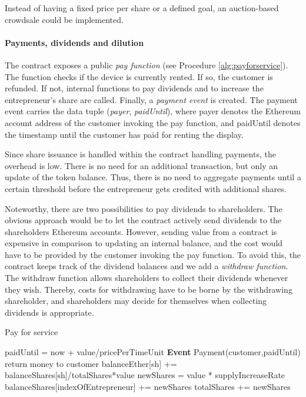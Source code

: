 Instead of having a fixed price per share or a defined goal, an auction-based crowdsale could be implemented.

\paragraph{Payments, dividends and dilution}

The contract exposes a public \emph{pay function} (see Procedure \ref{alg:payforservice}). The function checks if the device is currently rented. If so, the customer is refunded. If not, internal functions to pay dividends and to increase the entrepreneur's share are called. Finally, a \emph{payment event} is created. The payment event carries the data tuple (\emph{payer}, \emph{paidUntil}), where payer denotes the Ethereum account address of the customer invoking the pay function, and paidUntil denotes the timestamp until the customer has paid for renting the display. 

Since share issuance is handled within the contract handling payments, the overhead is low. There is no need for an additional transaction, but only an update of the token balance. Thus, there is no need to aggregate payments until a certain threshold before the entrepreneur gets credited with additional shares. 

Noteworthy, there are two possibilities to pay dividends to shareholders. The obvious approach would be to let the contract actively send dividends to the shareholders Ethereum accounts. However, sending value from a contract is expensive in comparison to updating an internal balance, and the cost would have to be provided by the customer invoking the pay function. To avoid this, the contract keeps track of the dividend balances and we add a \emph{withdraw function}. The withdraw function allows shareholders to collect their dividends whenever they wish. Thereby, costs for withdrawing have to be borne by the withdrawing shareholder, and shareholders may decide for themselves when collecting dividends is appropriate. 

\begin{algorithm}[!t]
   \caption{Pay for service}
    \begin{algorithmic}[1]
      \State {}
      \State {}
      \State paidUntil = now + value/pricePerTimeUnit
      \State \textbf{Event} Payment(customer,paidUntil)
      \Else 
      \State return money to customer
      \EndIf
      \Statex
      \State balanceEther[sh] += balanceShares[sh]/totalShares*value
      \EndFor
      \EndFunction
      \Statex
      \State newShares = value * supplyIncreaseRate
      \State balanceShares[indexOfEntrepreneur] += newShares
      \State totalShares += newShares
      \EndFunction
\end{algorithmic}
\label{alg:payforservice}
\end{algorithm}

